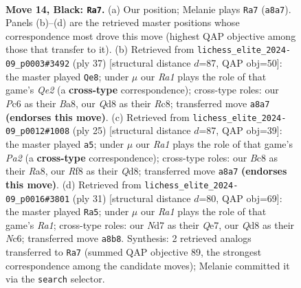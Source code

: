 \documentclass[11pt]{article}
\begin{document}
\clearpage

\begin{figure}[p]\centering
\begin{subfigure}{0.46\textwidth}\centering
\resizebox{\linewidth}{!}{%
\newchessgame
\chessboard[
  setfen={r1bq1rk1/1p1n1ppp/n1p1p3/p2pP3/3P1P2/2N2N2/PPPQ2PP/2R1KB1R b K - 3 14},
  showmover=false,
  pgfstyle=straightmove, color=movearrow, markmove={a8-a7}
]}
\caption{}
\end{subfigure}\hfill
\begin{subfigure}{0.46\textwidth}\centering
\resizebox{\linewidth}{!}{%
\newchessgame
\chessboard[
  setfen={b1rr2k1/3nqpb1/1pp1p1pp/p3P3/P1BP4/2N2N1P/1P2QPP1/R2R2K1 b - - 2 19},
  showmover=false,
  pgfstyle=straightmove, color=movearrow, markmove={e7-e8}
]}
\caption{}
\end{subfigure}
\\[4pt]
\begin{subfigure}{0.46\textwidth}\centering
\resizebox{\linewidth}{!}{%
\newchessgame
\chessboard[
  setfen={r2qnrk1/pp1nbppb/2p1p2p/4P3/2P2B2/2N2NP1/PP2QPBP/R3R1K1 b - - 2 13},
  showmover=false,
  pgfstyle=straightmove, color=movearrow, markmove={a7-a5}
]}
\caption{}
\end{subfigure}\hfill
\begin{subfigure}{0.46\textwidth}\centering
\resizebox{\linewidth}{!}{%
\newchessgame
\chessboard[
  setfen={r1b2rk1/1p1nqpp1/2n1p2p/2P5/p2pN3/3P1NP1/PPQ2PBP/2R1R1K1 b - - 4 16},
  showmover=false,
  pgfstyle=straightmove, color=movearrow, markmove={a8-a5}
]}
\caption{}
\end{subfigure}
\caption{\textbf{Move 14, Black: \texttt{Ra7}.} (a) Our position; Melanie plays \texttt{Ra7} (\texttt{a8a7}). Panels (b)--(d) are the retrieved master positions whose correspondence most drove this move (highest QAP objective among those that transfer to it). (b) Retrieved from \texttt{lichess\_elite\_2024-09\_p0003\#3492} (ply 37) [structural distance $d$=87, QAP obj=50]: the master played \texttt{Qe8}; under $\mu$ our \emph{Ra1} plays the role of that game's \emph{Qe2} (a \textbf{cross-type} correspondence); cross-type roles: our \emph{P}c6 as their \emph{B}a8, our \emph{Q}d8 as their \emph{R}c8; transferred move \texttt{a8a7} \textbf{(endorses this move)}. (c) Retrieved from \texttt{lichess\_elite\_2024-09\_p0012\#1008} (ply 25) [structural distance $d$=87, QAP obj=39]: the master played \texttt{a5}; under $\mu$ our \emph{Ra1} plays the role of that game's \emph{Pa2} (a \textbf{cross-type} correspondence); cross-type roles: our \emph{B}c8 as their \emph{R}a8, our \emph{R}f8 as their \emph{Q}d8; transferred move \texttt{a8a7} \textbf{(endorses this move)}. (d) Retrieved from \texttt{lichess\_elite\_2024-09\_p0016\#3801} (ply 31) [structural distance $d$=80, QAP obj=69]: the master played \texttt{Ra5}; under $\mu$ our \emph{Ra1} plays the role of that game's \emph{Ra1}; cross-type roles: our \emph{N}d7 as their \emph{Q}e7, our \emph{Q}d8 as their \emph{N}c6; transferred move \texttt{a8b8}. Synthesis: 2 retrieved analogs transferred to \texttt{Ra7} (summed QAP objective 89, the strongest correspondence among the candidate moves); Melanie committed it via the \texttt{search} selector.}
\label{fig:thought-m27}
\end{figure}
\end{document}
